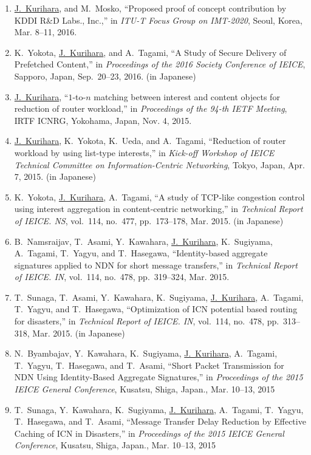 \begin{enumerate}
 \item \underline{J.~Kurihara}, and M.~Mosko, ``Proposed proof of concept contribution by KDDI R\&D Labs., Inc.,'' in \textit{ITU-T Focus Group on IMT-2020}, Seoul, Korea, Mar. 8--11, 2016.
 \item K.~Yokota, \underline{J.~Kurihara}, and A.~Tagami, ``A Study of Secure Delivery of Prefetched Content,'' in \textit{Proceedings of the 2016 Society Conference of IEICE}, Sapporo, Japan, Sep.~20--23, 2016. (in Japanese)
 \item \underline{J.~Kurihara}, ``$1$-to-$n$ matching between interest and content objects for reduction of router workload,'' in \textit{Proceedings of the 94-th IETF Meeting}, IRTF ICNRG, Yokohama, Japan, Nov. 4, 2015.
 \item \underline{J.~Kurihara}, K.~Yokota, K.~Ueda, and A.~Tagami, ``Reduction of router workload by using list-type interests,'' in \textit{Kick-off Workshop of IEICE Technical Committee on Information-Centric Networking}, Tokyo, Japan, Apr. 7, 2015. (in Japanese)
 \item K.~Yokota, \underline{J.~Kurihara}, A.~Tagami, ``A study of TCP-like congestion control using interest aggregation in content-centric networking,'' in \textit{Technical Report of IEICE. NS}, vol.~114, no.~477, pp.~173--178, Mar. 2015. (in Japanese)
 \item B.~Namsraijav, T.~Asami, Y.~Kawahara, \underline{J.~Kurihara}, K.~Sugiyama, A.~Tagami, T.~Yagyu, and T.~Hasegawa, ``Identity-based aggregate signatures applied to NDN for short message transfers,'' in \textit{Technical Report of IEICE. IN}, vol.~114, no.~478, pp.~319--324, Mar. 2015.
 \item T.~Sunaga, T.~Asami, Y.~Kawahara, K.~Sugiyama, \underline{J.~Kurihara}, A.~Tagami, T.~Yagyu, and T.~Hasegawa, ``Optimization of ICN potential based routing for disasters,'' in \textit{Technical Report of IEICE. IN}, vol.~114, no.~478, pp.~313--318, Mar. 2015. (in Japanese)
 \item N.~Byambajav, Y.~Kawahara, K.~Sugiyama, \underline{J.~Kurihara}, A.~Tagami, T.~Yagyu, T.~Hasegawa, and T.~Asami, ``Short Packet Transmission for NDN Using Identity-Based Aggregate Signatures,'' in \textit{Proceedings of the 2015 IEICE General Conference}, Kusatsu, Shiga, Japan., Mar. 10--13, 2015
 \item T.~Sunaga, Y.~Kawahara, K.~Sugiyama, \underline{J.~Kurihara}, A.~Tagami, T.~Yagyu, T.~Hasegawa, and T.~Asami, ``Message Transfer Delay Reduction by Effective Caching of ICN in Disasters,'' in \textit{Proceedings of the 2015 IEICE General Conference}, Kusatsu, Shiga, Japan., Mar. 10--13, 2015

\end{enumerate}
